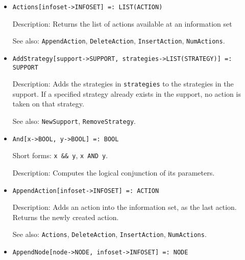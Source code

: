 \begin{itemize}


\item
\protect \large \begin{verbatim} 
Actions[infoset->INFOSET] =: LIST(ACTION)
\end{verbatim}\normalsize

\bd
\item
[Description:] Returns the list of actions available at an information set
\item
[See also:] {\tt AppendAction}, {\tt DeleteAction}, {\tt InsertAction},
{\tt NumActions}.
\ed

\item
\protect \large \begin{verbatim}
AddStrategy[support->SUPPORT, strategies->LIST(STRATEGY)] =: SUPPORT
\end{verbatim}\normalsize

\bd
\item
[Description:] Adds the strategies in \verb+strategies+ to the
strategies in the support.  If a specified strategy already exists in
the support, no action is taken on that strategy.
\item
[See also:] {\tt NewSupport}, {\tt RemoveStrategy}.
\ed

\item 
\protect \large \begin{verbatim}
And[x->BOOL, y->BOOL] =: BOOL
\end{verbatim} \normalsize
\bd
\item
[Short forms:] \verb+x && y+, \verb+x AND y+.
\item
[Description:] Computes the logical conjunction of its parameters.
\ed


\item
\protect \large \begin{verbatim}
AppendAction[infoset->INFOSET] =: ACTION
\end{verbatim}\normalsize

\bd
\item
[Description:] Adds an action into the information set, as the last
action.  Returns the newly created action.
\item
[See also:] {\tt Actions}, {\tt DeleteAction}, {\tt InsertAction},
{\tt NumActions}.
\ed


\item
\protect \large \begin{verbatim} 
AppendNode[node->NODE, infoset->INFOSET] =: NODE
\end{verbatim}\normalsize


\end{itemize}
